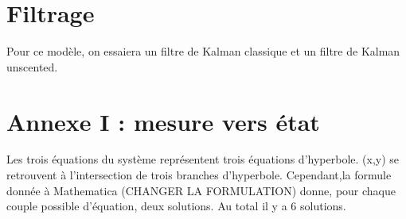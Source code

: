 \documentclass[a4paper, 8pt]{article}
\begin{document}
\section{Filtrage}

Pour ce modèle, on essaiera un filtre de Kalman classique et un filtre  de Kalman unscented.

%		
%	
%		
%



\section{Annexe I : mesure vers état}

Les trois équations du système représentent trois équations d'hyperbole. (x,y) se retrouvent à l'intersection de trois branches d'hyperbole. Cependant,la formule donnée à Mathematica (CHANGER LA FORMULATION) donne, pour chaque couple possible d'équation, deux solutions. Au total il y a 6 solutions.
\end{document}

